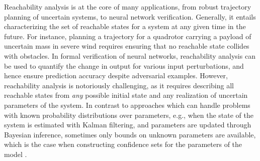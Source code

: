 \documentclass{article}
\begin{document}



Reachability analysis is at the core of many applications, from robust trajectory planning of uncertain systems, to neural network verification. 
Generally, 
it entails characterizing the set of reachable states for a system at any given time in the future. For instance, planning a trajectory for a quadrotor carrying a payload of uncertain mass in severe wind requires ensuring that no reachable state collides with obstacles. 
%
In formal verification of neural networks, reachability analysis can be used to quantify the change in output for various input perturbations, and hence ensure prediction accuracy despite adversarial examples. %
However, reachability analysis is notoriously challenging, as it requires describing all reachable states from \emph{any} possible initial state and any realization of uncertain parameters of the system. In contrast to approaches which can handle problems with known probability distributions over parameters, e.g., when the state of the system is estimated with Kalman filtering, and parameters are updated through Bayesian inference, sometimes only bounds on unknown parameters are available, which is the case when constructing confidence sets for the parameters of the model  \citep{abbasi2011improved}. 
\end{document}
